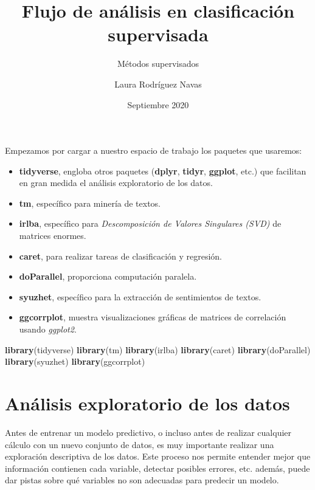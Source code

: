 \documentclass[]{article}
\title{Flujo de análisis en clasificación supervisada}
\subtitle{Métodos supervisados}
\author{Laura Rodríguez Navas}
\date{Septiembre 2020}
\newenvironment{Shaded}{\begin{snugshade}}{\end{snugshade}}
\newcommand{\KeywordTok}[1]{\textcolor[rgb]{0.13,0.29,0.53}{\textbf{#1}}}
\newcommand{\NormalTok}[1]{#1}
\providecommand{\tightlist}{%
  \setlength{\itemsep}{0pt}\setlength{\parskip}{0pt}}
\begin{document}
\maketitle

{
\setcounter{tocdepth}{2}
\tableofcontents
}
\newpage

Empezamos por cargar a nuestro espacio de trabajo los paquetes que
usaremos:

\begin{itemize}
\tightlist
\item
  \textbf{tidyverse}, engloba otros paquetes (\textbf{dplyr},
  \textbf{tidyr}, \textbf{ggplot}, etc.) que facilitan en gran medida el
  análisis exploratorio de los datos.
\item
  \textbf{tm}, específico para minería de textos.
\item
  \textbf{irlba}, específico para \emph{Descomposición de Valores
  Singulares (SVD)} de matrices enormes.
\item
  \textbf{caret}, para realizar tareas de clasificación y regresión.
\item
  \textbf{doParallel}, proporciona computación paralela.
\item
  \textbf{syuzhet}, específico para la extracción de sentimientos de
  textos.
\item
  \textbf{ggcorrplot}, muestra visualizaciones gráficas de matrices de
  correlación usando \emph{ggplot2}.
\end{itemize}

\begin{Shaded}
\begin{Highlighting}[]
\KeywordTok{library}\NormalTok{(tidyverse)}
\KeywordTok{library}\NormalTok{(tm)}
\KeywordTok{library}\NormalTok{(irlba)}
\KeywordTok{library}\NormalTok{(caret)}
\KeywordTok{library}\NormalTok{(doParallel)}
\KeywordTok{library}\NormalTok{(syuzhet)}
\KeywordTok{library}\NormalTok{(ggcorrplot)}
\end{Highlighting}
\end{Shaded}

\hypertarget{anuxe1lisis-exploratorio-de-los-datos}{%
\section{Análisis exploratorio de los
datos}\label{anuxe1lisis-exploratorio-de-los-datos}}

Antes de entrenar un modelo predictivo, o incluso antes de realizar
cualquier cálculo con un nuevo conjunto de datos, es muy importante
realizar una exploración descriptiva de los datos. Este proceso nos
permite entender mejor que información contienen cada variable, detectar
posibles errores, etc. además, puede dar pistas sobre qué variables no
son adecuadas para predecir un modelo.
\end{document}
